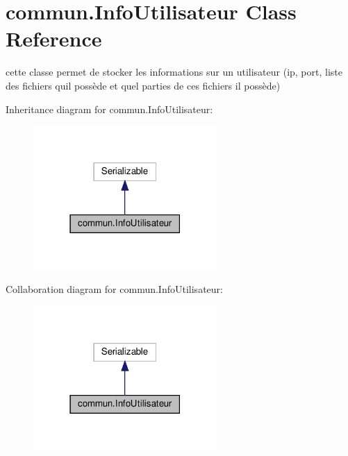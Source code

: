 \hypertarget{classcommun_1_1InfoUtilisateur}{}\section{commun.\+Info\+Utilisateur Class Reference}
\label{classcommun_1_1InfoUtilisateur}


cette classe permet de stocker les informations sur un utilisateur (ip, port, liste des fichiers qu\textquotesingle{}il possède et quel parties de ces fichiers il possède)  




Inheritance diagram for commun.\+Info\+Utilisateur\+:\nopagebreak
\begin{figure}[H]
\begin{center}
\leavevmode
\includegraphics[width=198pt]{classcommun_1_1InfoUtilisateur__inherit__graph}
\end{center}
\end{figure}


Collaboration diagram for commun.\+Info\+Utilisateur\+:\nopagebreak
\begin{figure}[H]
\begin{center}
\leavevmode
\includegraphics[width=198pt]{classcommun_1_1InfoUtilisateur__coll__graph}
\end{center}
\end{figure}
